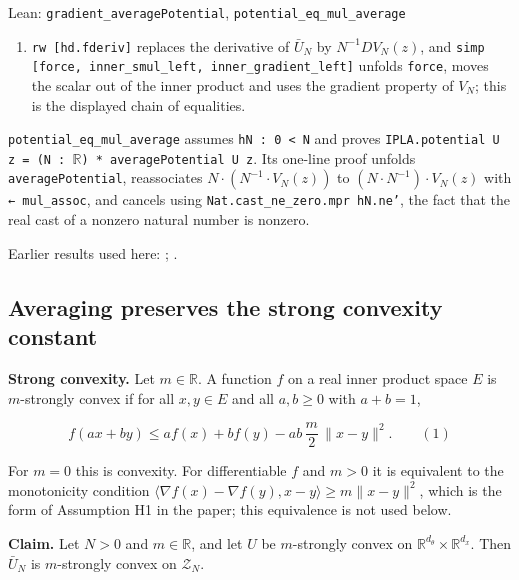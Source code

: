 \documentclass[11pt,a4paper]{report}
\begin{document}
\begin{leanbox}{Lean: \texttt{gradient\_\allowbreak{}averagePotential}, \texttt{potential\_\allowbreak{}eq\_\allowbreak{}mul\_\allowbreak{}average}}
\begin{enumerate}
\item \texttt{rw [hd.\allowbreak{}fderiv]} replaces the derivative of \(\bar U_N\) by \(N^{-1}DV_N(z)\), and \texttt{simp [force, inner\_\allowbreak{}smul\_\allowbreak{}left, inner\_\allowbreak{}gradient\_\allowbreak{}left]} unfolds \texttt{force}, moves the scalar out of the inner product and uses the gradient property of \(V_N\); this is the displayed chain of equalities.

\end{enumerate}



\texttt{potential\_\allowbreak{}eq\_\allowbreak{}mul\_\allowbreak{}average} assumes \texttt{h\allowbreak{}N : 0 < N} and proves \texttt{IPLA.\allowbreak{}potential U z = (N : \ensuremath{\mathbb R}) * average\allowbreak{}Potential U z}. Its one-line proof unfolds \texttt{average\allowbreak{}Potential}, reassociates \(N\cdot(N^{-1}\cdot V_N(z))\) to \((N\cdot N^{-1})\cdot V_N(z)\) with \texttt{← mul\_\allowbreak{}assoc}, and cancels using \texttt{Nat.\allowbreak{}cast\_\allowbreak{}ne\_\allowbreak{}zero.\allowbreak{}mpr h\allowbreak{}N.\allowbreak{}ne'}, the fact that the real cast of a nonzero natural number is nonzero.
\end{leanbox}


Earlier results used here: \cite[Section~3.1.1]{LangevinLean2026IPLA}; \cite[Section~3.1.3]{LangevinLean2026IPLA}.
\subsection{\texorpdfstring{Averaging preserves the strong convexity constant}{Averaging preserves the strong convexity constant}}
\label{report-step-KIPLMC-Geometry-lean-3}


\textbf{Strong convexity.} Let \(m\in\mathbb R\). A function \(f\) on a real inner product space \(E\) is \(m\)-strongly convex if for all \(x,y\in E\) and all \(a,b\ge0\) with \(a+b=1\),


\[f(ax+by)\le af(x)+bf(y)-ab\,\frac m2\,\|x-y\|^2.\qquad(1)\]


For \(m=0\) this is convexity. For differentiable \(f\) and \(m>0\) it is equivalent to the monotonicity condition \(\langle\nabla f(x)-\nabla f(y),x-y\rangle\ge m\|x-y\|^2\), which is the form of Assumption H1 in the paper; this equivalence is not used below.




\textbf{Claim.} Let \(N>0\) and \(m\in\mathbb R\), and let \(U\) be \(m\)-strongly convex on \(\mathbb R^{d_\theta}\times\mathbb R^{d_x}\). Then \(\bar U_N\) is \(m\)-strongly convex on \(\mathcal Z_N\).
\end{document}
